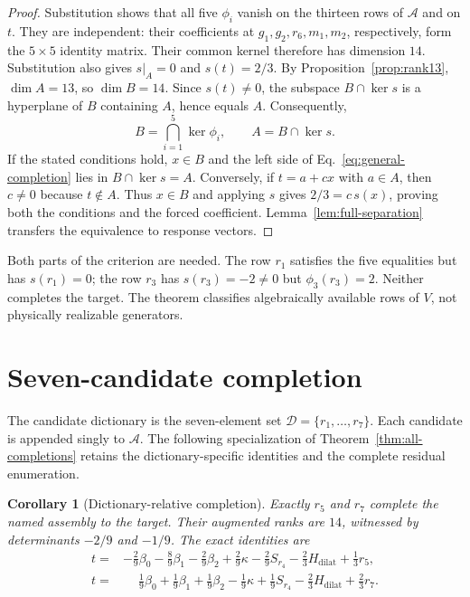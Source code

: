 \documentclass[12pt]{article}
\newtheorem{corollary}[theorem]{Corollary}
\theoremstyle{definition}
\theoremstyle{remark}
\newcommand{\target}{t}
\begin{document}
\begin{proof}
Substitution shows that all five $\phi_i$ vanish on the thirteen rows of
$\mathcal A$ and on $\target$.  They are independent: their coefficients at
$g_1,g_2,r_6,m_1,m_2$, respectively, form the $5\times5$ identity matrix.
Their common kernel therefore has dimension $14$.  Substitution also gives
$s|_A=0$ and $s(\target)=2/3$.  By Proposition~\ref{prop:rank13},
$\dim A=13$, so $\dim B=14$.  Since $s(\target)\ne0$, the subspace
$B\cap\ker s$ is a hyperplane of $B$ containing $A$, hence equals $A$.
Consequently,
\[
B=\bigcap_{i=1}^5\ker\phi_i,\qquad A=B\cap\ker s.
\]
If the stated conditions hold, $x\in B$ and the left side of
Eq.~\eqref{eq:general-completion} lies in $B\cap\ker s=A$.
Conversely, if $\target=a+cx$ with $a\in A$, then $c\ne0$ because
$\target\notin A$.  Thus $x\in B$ and applying $s$ gives
$2/3=c\,s(x)$, proving both the conditions and the forced coefficient.
Lemma~\ref{lem:full-separation} transfers the equivalence to response vectors.
\end{proof}

Both parts of the criterion are needed.  The row $r_1$ satisfies the five
equalities but has $s(r_1)=0$; the row $r_3$ has $s(r_3)=-2\ne0$ but
$\phi_3(r_3)=2$.  Neither completes the target.  The theorem classifies
algebraically available rows of $V$, not physically realizable generators.

\section{Seven-candidate completion}\label{sec:completion}

The candidate dictionary is the seven-element set
$\mathcal D=\{r_1,\ldots,r_7\}$.  Each candidate is appended singly to
$\mathcal A$.  The following specialization of
Theorem~\ref{thm:all-completions} retains the dictionary-specific identities
and the complete residual enumeration.

\begin{corollary}[Dictionary-relative completion]\label{thm:completion}
Exactly $r_5$ and $r_7$ complete the named assembly to the target.  Their
augmented ranks are $14$, witnessed by determinants $-2/9$ and $-1/9$.
The exact identities are
\begin{align}
\target={}&-\tfrac29\beta_0-\tfrac89\beta_1-\tfrac29\beta_2
 +\tfrac29\kappa-\tfrac29S_{r_4}-\tfrac23H_{\mathrm{dilat}}
 +\tfrac13r_5,\label{eq:r5-recipe}\\
\target={}&\phantom{-}\tfrac19\beta_0+\tfrac19\beta_1+\tfrac19\beta_2
 -\tfrac19\kappa+\tfrac19S_{r_4}-\tfrac23H_{\mathrm{dilat}}
 +\tfrac23r_7.\label{eq:r7-recipe}
\end{align}
\end{corollary}
\end{document}

